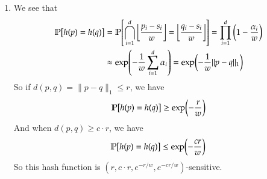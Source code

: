 \documentclass[12pt]{article}
\theoremstyle{definitionstyle}
\newcommand{\mg}[1]{\| #1 \|}
\newcommand{\floor}[1]{\left\lfloor#1\right\rfloor}
\renewcommand{\P}{\mathbb{P}\qty}
\begin{document}
\begin{enumerate}[leftmargin=\labelsep]
\begin{enumerate}
		\item We see that
		\begin{align*}
			\P[h(p)=h(q)] &= \P[\bigcap_{i=1}^d \floor{\frac{p_i-s_i}{w}} = \floor{\frac{q_i-s_i}{w}}] = \prod_{i=1}^d \qty(1-\frac{\alpha_i}{w}) \\
			&\approx \exp(-\frac1w\sum_{i=1}^d \alpha_i) = \exp(-\frac1w \mg{p-q}_1)
		\end{align*}
		So if $d(p, q) = \mg{p-q}_1 \leq r$, we have
		\begin{align*}
			\P[h(p)=h(q)] \geq \exp(-\frac rw)
		\end{align*}
		And when $d(p, q) \geq c \cdot r$, we have
		\begin{align*}
			\P[h(p)=h(q)] \leq \exp(-\frac{cr}{w})
		\end{align*}
		So this hash function is $(r, c \cdot r, e^{-r/w}, e^{-cr/w})$-sensitive.
		\end{enumerate}
	\end{enumerate}
\end{document}

